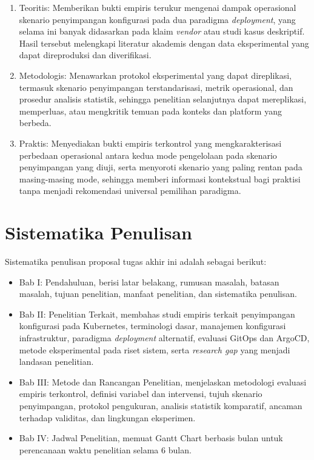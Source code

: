 \begin{enumerate}
  \item Teoritis: Memberikan bukti empiris terukur mengenai dampak operasional skenario penyimpangan konfigurasi pada dua paradigma \textit{deployment}, yang selama ini banyak didasarkan pada klaim \textit{vendor} atau studi kasus deskriptif. Hasil tersebut melengkapi literatur akademis dengan data eksperimental yang dapat direproduksi dan diverifikasi.
  
  \item Metodologis: Menawarkan protokol eksperimental yang dapat direplikasi, termasuk skenario penyimpangan terstandarisasi, metrik operasional, dan prosedur analisis statistik, sehingga penelitian selanjutnya dapat mereplikasi, memperluas, atau mengkritik temuan pada konteks dan platform yang berbeda.
  
  \item Praktis: Menyediakan bukti empiris terkontrol yang mengkarakterisasi perbedaan operasional antara kedua mode pengelolaan pada skenario penyimpangan yang diuji, serta menyoroti skenario yang paling rentan pada masing-masing mode, sehingga memberi informasi kontekstual bagi praktisi tanpa menjadi rekomendasi universal pemilihan paradigma.
\end{enumerate}

\section{Sistematika Penulisan}

Sistematika penulisan proposal tugas akhir ini adalah sebagai berikut:

\begin{itemize}
  \item Bab I: Pendahuluan, berisi latar belakang, rumusan masalah, batasan masalah, tujuan penelitian, manfaat penelitian, dan sistematika penulisan.
  \item Bab II: Penelitian Terkait, membahas studi empiris terkait penyimpangan konfigurasi pada Kubernetes, terminologi dasar, manajemen konfigurasi infrastruktur, paradigma \textit{deployment} alternatif, evaluasi GitOps dan ArgoCD, metode eksperimental pada riset sistem, serta \textit{research gap} yang menjadi landasan penelitian.
  \item Bab III: Metode dan Rancangan Penelitian, menjelaskan metodologi evaluasi empiris terkontrol, definisi variabel dan intervensi, tujuh skenario penyimpangan, protokol pengukuran, analisis statistik komparatif, ancaman terhadap validitas, dan lingkungan eksperimen.
  \item Bab IV: Jadwal Penelitian, memuat Gantt Chart berbasis bulan untuk perencanaan waktu penelitian selama 6 bulan.
\end{itemize}
